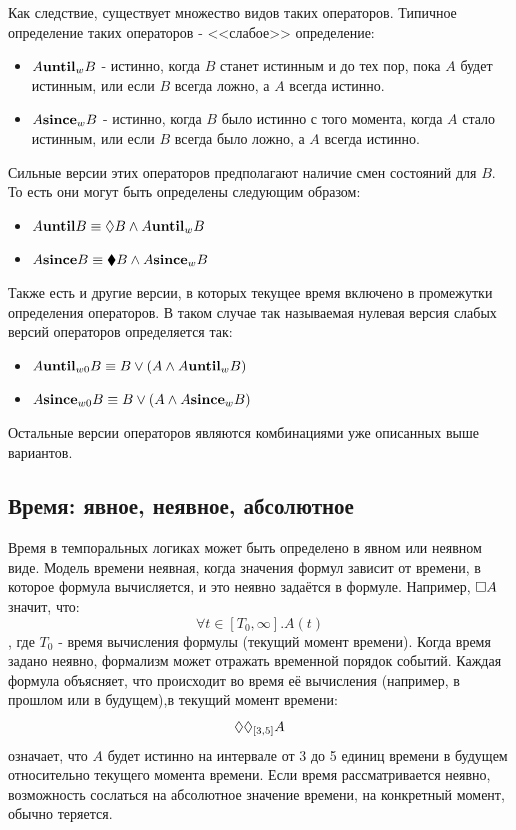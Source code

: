 		Как следствие, существует множество видов таких операторов. Типичное определение таких операторов - <<слабое>> определение:
		\begin{itemize}
			\item $ A \text{\textbf{until}}_w B $ - истинно, когда $ B $ станет истинным и до тех пор, пока $ A $ будет истинным, или если $ B $ всегда ложно, а $ A $ всегда истинно.
			\item $ A \text{\textbf{since}}_w B $ - истинно, когда $ B $ было истинно с того момента, когда $ A $ стало истинным, или если $ B $ всегда было ложно, а $ A $ всегда истинно.
		\end{itemize}
		
		Сильные версии этих операторов предполагают наличие смен состояний для $ B $. То есть они могут быть определены следующим образом:
		\begin{itemize}
			\item $ A \text{\textbf{until}} B \equiv \lozenge B \land A \text{\textbf{until}}_w B $
			\item $ A \text{\textbf{since}} B \equiv \blacklozenge B \land A \text{\textbf{since}}_w B $
		\end{itemize}
	
		Также есть и другие версии, в которых текущее время включено в промежутки определения операторов.
		В таком случае так называемая нулевая версия слабых версий операторов определяется так:
		\begin{itemize}
			\item $ A \text{\textbf{until}}_{w0} B \equiv B \lor (A \land A \text{\textbf{until}}_w B)$
			\item $ A \text{\textbf{since}}_{w0} B \equiv B \lor (A \land A \text{\textbf{since}}_w B)$
		\end{itemize}
		
		Остальные версии операторов являются комбинациями уже описанных выше вариантов.
		
		\subsection{Время: явное, неявное, абсолютное}
		 Время в темпоральных логиках может быть определено в явном или неявном виде. 
		 Модель времени неявная, когда значения формул зависит от времени, в которое формула вычисляется, и это неявно задаётся в формуле. 
		 Например, $ \square A $ значит, что:\[\forall t \in [T_0, \infty].A(t) \], где $ T_0 $ - время вычисления формулы (текущий момент времени).
		 Когда время задано неявно, формализм может отражать временной порядок событий.
		 Каждая формула объясняет, что происходит во время её вычисления (например, в прошлом или в будущем),в текущий момент времени:\[\lozenge \lozenge_{[3,5]} A \] означает, что $ A $ будет истинно на интервале от 3 до 5 единиц времени в будущем относительно текущего момента времени.
		 Если время рассматривается неявно, возможность сослаться на абсолютное значение времени, на конкретный момент, обычно теряется. 
		 
